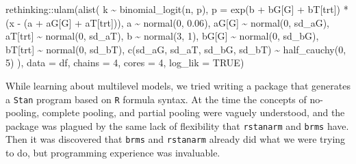 \documentclass[11pt, oneside, openany]{scrbook}
\newenvironment{Shaded}{\begin{snugshade}}{\end{snugshade}}
\newcommand{\AttributeTok}[1]{\textcolor[rgb]{0.77,0.63,0.00}{#1}}
\newcommand{\ConstantTok}[1]{\textcolor[rgb]{0.00,0.00,0.00}{#1}}
\newcommand{\DecValTok}[1]{\textcolor[rgb]{0.00,0.00,0.81}{#1}}
\newcommand{\FloatTok}[1]{\textcolor[rgb]{0.00,0.00,0.81}{#1}}
\newcommand{\FunctionTok}[1]{\textcolor[rgb]{0.00,0.00,0.00}{#1}}
\newcommand{\NormalTok}[1]{#1}
\newcommand{\SpecialCharTok}[1]{\textcolor[rgb]{0.00,0.00,0.00}{#1}}
\begin{document}

\begin{Shaded}
\begin{Highlighting}[]
\NormalTok{rethinking}\SpecialCharTok{::}\FunctionTok{ulam}\NormalTok{(}\FunctionTok{alist}\NormalTok{(}
\NormalTok{  k }\SpecialCharTok{\textasciitilde{}} \FunctionTok{binomial\_logit}\NormalTok{(n, p),}
  \AttributeTok{p =} \FunctionTok{exp}\NormalTok{(b }\SpecialCharTok{+}\NormalTok{ bG[G] }\SpecialCharTok{+}\NormalTok{ bT[trt]) }\SpecialCharTok{*}\NormalTok{ (x }\SpecialCharTok{{-}}\NormalTok{ (a }\SpecialCharTok{+}\NormalTok{ aG[G] }\SpecialCharTok{+}\NormalTok{ aT[trt])),}
\NormalTok{  a }\SpecialCharTok{\textasciitilde{}} \FunctionTok{normal}\NormalTok{(}\DecValTok{0}\NormalTok{, }\FloatTok{0.06}\NormalTok{),}
\NormalTok{  aG[G] }\SpecialCharTok{\textasciitilde{}} \FunctionTok{normal}\NormalTok{(}\DecValTok{0}\NormalTok{, sd\_aG),}
\NormalTok{  aT[trt] }\SpecialCharTok{\textasciitilde{}} \FunctionTok{normal}\NormalTok{(}\DecValTok{0}\NormalTok{, sd\_aT),}
\NormalTok{  b }\SpecialCharTok{\textasciitilde{}} \FunctionTok{normal}\NormalTok{(}\DecValTok{3}\NormalTok{, }\DecValTok{1}\NormalTok{),}
\NormalTok{  bG[G] }\SpecialCharTok{\textasciitilde{}} \FunctionTok{normal}\NormalTok{(}\DecValTok{0}\NormalTok{, sd\_bG),}
\NormalTok{  bT[trt] }\SpecialCharTok{\textasciitilde{}} \FunctionTok{normal}\NormalTok{(}\DecValTok{0}\NormalTok{, sd\_bT),}
  \FunctionTok{c}\NormalTok{(sd\_aG, sd\_aT, sd\_bG, sd\_bT) }\SpecialCharTok{\textasciitilde{}} \FunctionTok{half\_cauchy}\NormalTok{(}\DecValTok{0}\NormalTok{, }\DecValTok{5}\NormalTok{)}
\NormalTok{), }\AttributeTok{data =}\NormalTok{ df, }\AttributeTok{chains =} \DecValTok{4}\NormalTok{, }\AttributeTok{cores =} \DecValTok{4}\NormalTok{, }\AttributeTok{log\_lik =} \ConstantTok{TRUE}\NormalTok{)}
\end{Highlighting}
\end{Shaded}


While learning about multilevel models, we tried writing a package that generates a \texttt{Stan} program based on \texttt{R} formula syntax. At the time the concepts of no-pooling, complete pooling, and partial pooling were vaguely understood, and the package was plagued by the same lack of flexibility that \texttt{rstanarm} and \texttt{brms} have. Then it was discovered that \texttt{brms} and \texttt{rstanarm} already did what we were trying to do, but programming experience was invaluable.
\end{document}
